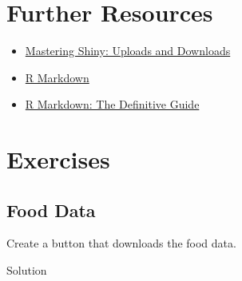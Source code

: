 \documentclass[
  oneside]{book}
\newenvironment{Shaded}{\begin{snugshade}}{\end{snugshade}}
\newcommand{\AttributeTok}[1]{\textcolor[rgb]{0.77,0.63,0.00}{#1}}
\newcommand{\CommentTok}[1]{\textcolor[rgb]{0.56,0.35,0.01}{\textit{#1}}}
\newcommand{\ControlFlowTok}[1]{\textcolor[rgb]{0.13,0.29,0.53}{\textbf{#1}}}
\newcommand{\DocumentationTok}[1]{\textcolor[rgb]{0.56,0.35,0.01}{\textbf{\textit{#1}}}}
\newcommand{\FunctionTok}[1]{\textcolor[rgb]{0.00,0.00,0.00}{#1}}
\newcommand{\NormalTok}[1]{#1}
\newcommand{\OtherTok}[1]{\textcolor[rgb]{0.56,0.35,0.01}{#1}}
\newcommand{\SpecialCharTok}[1]{\textcolor[rgb]{0.00,0.00,0.00}{#1}}
\newcommand{\StringTok}[1]{\textcolor[rgb]{0.31,0.60,0.02}{#1}}
\providecommand{\tightlist}{%
  \setlength{\itemsep}{0pt}\setlength{\parskip}{0pt}}
\begin{document}
\hypertarget{resources-reports}{%
\section{Further Resources}\label{resources-reports}}

\begin{itemize}
\tightlist
\item
  \href{https://mastering-shiny.org/action-transfer.html}{Mastering Shiny: Uploads and Downloads}
\item
  \href{https://rmarkdown.rstudio.com/}{R Markdown}
\item
  \href{https://bookdown.org/yihui/rmarkdown/}{R Markdown: The Definitive Guide}
\end{itemize}

\hypertarget{exercises-reports}{%
\section{Exercises}\label{exercises-reports}}

\hypertarget{food-data}{%
\subsection*{Food Data}\label{food-data}}

Create a button that downloads the food data.

Solution

\begin{Shaded}
\end{Shaded}
\end{document}
